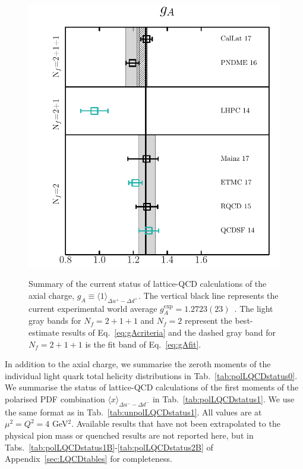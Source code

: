 \begin{figure}[!t]
\centering
\includegraphics[scale=0.7]{plots/ga_summary.pdf}\\
\caption{\small Summary of the current status of lattice-QCD calculations of 
the axial charge, $g_A\equiv \langle 1\rangle_{\Delta u^+-\Delta d^+}$.
%
The vertical black line represents the current experimental world average 
$g_A^{\mathrm{exp}} = 1.2723(23)$~\cite{Olive:2016xmw}. 
%
The light gray bands for $N_f=2+1+1$ and $N_f=2$ represent the best-estimate 
results of Eq.~\eqref{eq:gAcriteria} and the dashed gray band for
$N_f=2+1+1$ is the fit band of Eq.~\eqref{eq:gAfit}.}    
\label{fig:gaLQCDstatus}
\end{figure}

In addition to the axial charge, we summarise the zeroth moments of the 
individual light quark total helicity distributions in 
Tab.~\ref{tab:polLQCDstatus0}. 
%
We summarise the status of lattice-QCD calculations of the
first moments of the polarised PDF combination 
$\langle x \rangle_{\Delta u^- - \Delta d^-}$ in Tab.~\ref{tab:polLQCDstatus1}. 
%
We use the same format as in Tab.~\ref{tab:unpolLQCDstatus1}.
%
All values are at $\mu^2=Q^2=4$ GeV$^2$.
%
Available results that have not been extrapolated to the physical pion mass
or quenched results are not reported here, but in 
Tabs.~\ref{tab:polLQCDstatus1B}-\ref{tab:polLQCDstatus2B} of
Appendix~\ref{sec:LQCDtables} for completeness.

